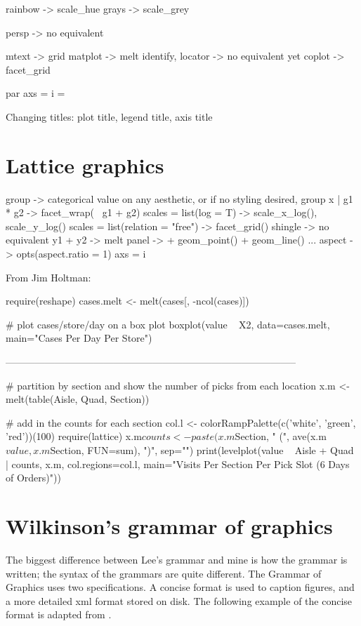 rainbow -> scale_hue
grays -> scale_grey

persp -> no equivalent

mtext -> grid
matplot -> melt
identify, locator -> no equivalent yet
coplot -> facet_grid

par
axs = i = 

Changing titles: plot title, legend title, axis title

\section{Lattice graphics}
\label{sec:lattice_graphics}

group -> categorical value on any aesthetic, or if no styling desired, group
x | g1 * g2 -> facet_wrap(~ g1 + g2)
scales = list(log = T) -> scale_x_log(), scale_y_log()
scales = list(relation = "free") -> facet_grid()
shingle -> no equivalent
y1 + y2 -> melt
panel -> + geom_point() + geom_line() ...
aspect -> opts(aspect.ratio = 1)
axs = i


From Jim Holtman:

require(reshape)
cases.melt <- melt(cases[, -ncol(cases)])

# plot cases/store/day on a box plot
boxplot(value ~ X2, data=cases.melt, main="Cases Per Day Per Store")

-----------------------------------------------------------------------------------------

# partition by section and show the number of picks from each location
x.m <- melt(table(Aisle, Quad, Section))

# add in the counts for each section
col.l <- colorRampPalette(c('white', 'green', 'red'))(100)
require(lattice)
x.m$counts <- paste(x.m$Section, " (", ave(x.m$value, x.m$Section,
FUN=sum), ")", sep="")
print(levelplot(value ~ Aisle + Quad | counts, x.m, col.regions=col.l,
   main="Visits Per Section Per Pick Slot (6 Days of Orders)"))

\section{Wilkinson's grammar of graphics}

The biggest difference between Lee's grammar and mine is how the grammar is written; the syntax of the grammars are quite different.  The Grammar of Graphics uses two specifications.  A concise format is used to caption figures, and a more detailed xml format stored on disk.  The following example of the concise format is adapted from \citet[][Figure 1.5, page 13]{wilkinson:2006}.

